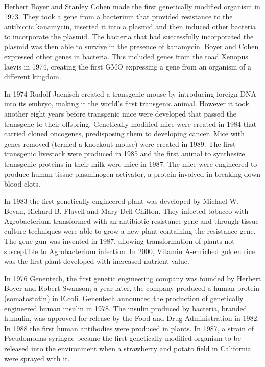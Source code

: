 Herbert Boyer and Stanley Cohen made the first genetically modified organism in 1973. They took a gene from a bacterium that provided resistance to the antibiotic kanamycin, inserted it into a plasmid and then induced other bacteria to incorporate the plasmid. The bacteria that had successfully incorporated the plasmid was then able to survive in the presence of kanamycin. Boyer and Cohen expressed other genes in bacteria. This included genes from the toad Xenopus laevis in 1974, creating the first GMO expressing a gene from an organism of a different kingdom.

In 1974 Rudolf Jaenisch created a transgenic mouse by introducing foreign DNA into its embryo, making it the world's first transgenic animal. However it took another eight years before transgenic mice were developed that passed the transgene to their offspring. Genetically modified mice were created in 1984 that carried cloned oncogenes, predisposing them to developing cancer. Mice with genes removed (termed a knockout mouse) were created in 1989. The first transgenic livestock were produced in 1985 and the first animal to synthesize transgenic proteins in their milk were mice in 1987. The mice were engineered to produce human tissue plasminogen activator, a protein involved in breaking down blood clots.

In 1983 the first genetically engineered plant was developed by Michael W. Bevan, Richard B. Flavell and Mary-Dell Chilton. They infected tobacco with Agrobacterium transformed with an antibiotic resistance gene and through tissue culture techniques were able to grow a new plant containing the resistance gene. The gene gun was invented in 1987, allowing transformation of plants not susceptible to Agrobacterium infection. In 2000, Vitamin A-enriched golden rice was the first plant developed with increased nutrient value.

In 1976 Genentech, the first genetic engineering company was founded by Herbert Boyer and Robert Swanson; a year later, the company produced a human protein (somatostatin) in E.coli. Genentech announced the production of genetically engineered human insulin in 1978. The insulin produced by bacteria, branded humulin, was approved for release by the Food and Drug Administration in 1982. In 1988 the first human antibodies were produced in plants. In 1987, a strain of Pseudomonas syringae became the first genetically modified organism to be released into the environment when a strawberry and potato field in California were sprayed with it.

